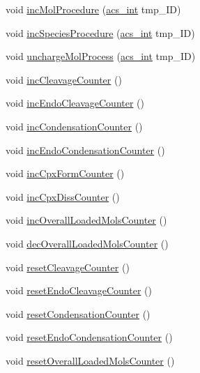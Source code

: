 \begin{DoxyCompactItemize}
void \hyperlink{classenvironment_a094499a0f1bb3c2342a3b16944f5280d}{inc\-Mol\-Procedure} (\hyperlink{acs__headers_8h_a8d277355641a098190360234e2ebde35}{acs\-\_\-int} tmp\-\_\-\-I\-D)
\item 
void \hyperlink{classenvironment_a7ac85445b4710257723c581c35cc5ac8}{inc\-Species\-Procedure} (\hyperlink{acs__headers_8h_a8d277355641a098190360234e2ebde35}{acs\-\_\-int} tmp\-\_\-\-I\-D)
\item 
void \hyperlink{classenvironment_af21c066ce18c8a39740f66a995782fb9}{uncharge\-Mol\-Process} (\hyperlink{acs__headers_8h_a8d277355641a098190360234e2ebde35}{acs\-\_\-int} tmp\-\_\-\-I\-D)
\item 
void \hyperlink{classenvironment_a480887ed06f63d34e014c19ea302d3d5}{inc\-Cleavage\-Counter} ()
\item 
void \hyperlink{classenvironment_ab0fc2cd6ed209d61286b837bd5460d90}{inc\-Endo\-Cleavage\-Counter} ()
\item 
void \hyperlink{classenvironment_a3fae8e57fad9ef5b182e32d9bb9989af}{inc\-Condensation\-Counter} ()
\item 
void \hyperlink{classenvironment_a01812d540519696ab07c9f822119cc64}{inc\-Endo\-Condensation\-Counter} ()
\item 
void \hyperlink{classenvironment_afd3d590aa9b6a644cb360cc5fd47e16a}{inc\-Cpx\-Form\-Counter} ()
\item 
void \hyperlink{classenvironment_a73f88a08ff9206e48063cccb1729ee6b}{inc\-Cpx\-Diss\-Counter} ()
\item 
void \hyperlink{classenvironment_a719b14624d9a2f891b8d4eb47649a00e}{inc\-Overall\-Loaded\-Mols\-Counter} ()
\item 
void \hyperlink{classenvironment_a6686b0489ed94f11c4b03c011978f9af}{dec\-Overall\-Loaded\-Mols\-Counter} ()
\item 
void \hyperlink{classenvironment_a0b1e324c651c86cb54279e022c14dc6d}{reset\-Cleavage\-Counter} ()
\item 
void \hyperlink{classenvironment_a3362d147de095640619d9b44f7f20bba}{reset\-Endo\-Cleavage\-Counter} ()
\item 
void \hyperlink{classenvironment_ac7deab8db2f581077da735c3542d8f1b}{reset\-Condensation\-Counter} ()
\item 
void \hyperlink{classenvironment_a55cff0bc2f8de4d3e4db471cad580a86}{reset\-Endo\-Condensation\-Counter} ()
\item 
void \hyperlink{classenvironment_abc04de785dddab4703fdcf52ccdf85f9}{reset\-Overall\-Loaded\-Mols\-Counter} ()
\item 

\end{DoxyCompactItemize}
